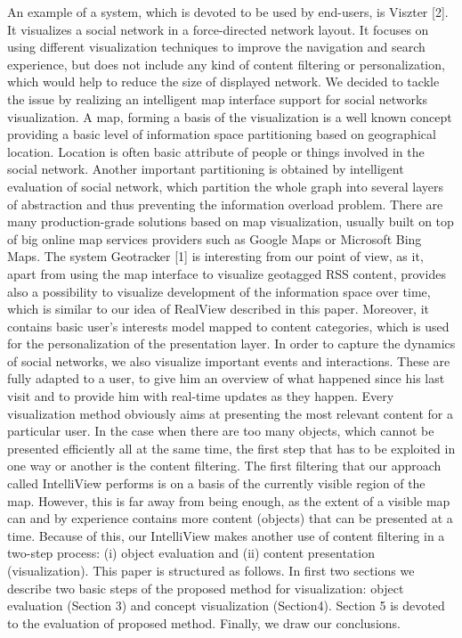 \documentclass{llncs}
\begin{document}
An example of a system, which is devoted to be used by end-users, is Viszter [2]. It visualizes a social network in a force-directed network layout. It focuses on using different visualization techniques to improve the navigation and search experience, but does not include any kind of content filtering or personalization, which would help to reduce the size of displayed network.
We decided to tackle the issue by realizing an intelligent map interface support for social networks visualization. A map, forming a basis of the visualization is a well known concept providing a basic level of information space partitioning based on geographical location. Location is often basic attribute of people or things involved in the social network. Another important partitioning is obtained by intelligent evaluation of social network, which partition the whole graph into several layers of abstraction and thus preventing the information overload problem.
There are many production-grade solutions based on map visualization, usually built on top of big online map services providers such as Google Maps or Microsoft Bing Maps. The system Geotracker [1] is interesting from our point of view, as it, apart from using the map interface to visualize geotagged RSS content, provides also a possibility to visualize development of the information space over time, which is similar to our idea of RealView described in this paper. Moreover, it contains basic user’s interests model mapped to content categories, which is used for the personalization of the presentation layer.
In order to capture the dynamics of social networks, we also visualize important events and interactions. These are fully adapted to a user, to give him an overview of what happened since his last visit and to provide him with real-time updates as they happen.
Every visualization method obviously aims at presenting the most relevant content for a particular user. In the case when there are too many objects, which cannot be presented efficiently all at the same time, the first step that has to be exploited in one way or another is the content filtering. The first filtering that our approach called IntelliView performs is on a basis of the currently visible region of the map. However, this is far away from being enough, as the extent of a visible map can and by experience contains more content (objects) that can be presented at a time. Because of this, our IntelliView makes another use of content filtering in a two-step process: (i) object evaluation and (ii) content presentation (visualization).
This paper is structured as follows. In first two sections we describe two basic steps of the proposed method for visualization: object evaluation (Section 3) and concept visualization (Section4). Section 5 is devoted to the evaluation of proposed method. Finally, we draw our conclusions.
\end{document}

